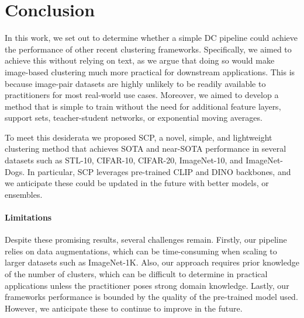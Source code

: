 \section{Conclusion}
In this work, we set out to determine whether a simple DC pipeline could achieve the performance of other recent clustering frameworks. Specifically, we aimed to achieve this without relying on text, as we argue that doing so would make image-based clustering much more practical for downstream applications. This is because image-pair datasets are highly unlikely to be readily available to practitioners for most real-world use cases. Moreover, we aimed to develop a method that is simple to train without the need for additional feature layers, support sets, teacher-student networks, or exponential moving averages.

To meet this desiderata we proposed SCP, a novel, simple, and lightweight clustering method that achieves SOTA and near-SOTA performance in several datasets such as STL-10, CIFAR-10, CIFAR-20, ImageNet-10, and ImageNet-Dogs. In particular, SCP leverages pre-trained CLIP and DINO backbones, and we anticipate these could be updated in the future with better models, or ensembles.


\paragraph{Limitations} Despite these promising results, several challenges remain. Firstly, our pipeline relies on data augmentations, which can be time-consuming when scaling to larger datasets such as ImageNet-1K. Also, our approach requires prior knowledge of the number of clusters, which can be difficult to determine in practical applications unless the practitioner poses strong domain knowledge. Lastly, our frameworks performance is bounded by the quality of the pre-trained model used. However, we anticipate these to continue to improve in the future.




